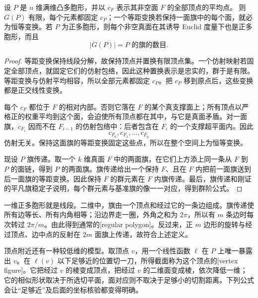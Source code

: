 \begin{lemma}
	\label{g1:lem:regular-polytope-centers}
	设 \(P\) 是 \(n\) 维满维凸多胞形，并以 \(c_F\) 表示其非空面 \(F\) 的全部顶点的平均点。
	则 \(G(P)\) 有限，每个元素都固定 \(c_P\)；一个等距变换若保持一面旗中的每个面，就必为恒等变换。若 \(P\) 为正多胞形，则每个非空真面在其诱导 Euclid 度量下也是正多胞形，而且
	\[
		|G(P)|=\text{\(P\) 的旗的数目}.
	\]
\end{lemma}
\begin{proof}
	等距变换保持线段分解，故保持顶点并置换有限顶点集。一个仿射映射若固定全部顶点，就固定它们的仿射包络，因此这种置换表示是忠实的，群于是有限。等距变换与仿射平均相容，所以全部元素都固定 \(c_P\)。把 \(c_P\) 移到原点后，这些变换都是正交线性变换。

	每个 \(c_F\) 都位于 \(F\) 的相对内部。否则它落在 \(F\) 的某个真支撑面上；所有顶点以严格正的权重平均到这个面，会迫使所有顶点都在其中，与它是真面矛盾。对一面旗，\(c_{F_i}\) 因而不在 \(F_{i-1}\) 的仿射包络中：后者包含在 \(F_i\) 的一个支撑超平面内。因此
	\[
		c_{F_0},c_{F_1},\ldots,c_{F_n}
	\]
	仿射无关。保持这面旗的等距变换固定这些点，所以在整个空间上为恒等变换。

	现设 \(P\) 旗传递。取一个 \(k\) 维真面 \(F\) 中的两面旗，在它们上方添上同一条从 \(F\) 到 \(P\) 的面链，得到 \(P\) 的两面旗。旗传递给出一个保持 \(F\)、且在 \(F\) 内把前一面旗送到后一面旗的等距变换。因此保持 \(F\) 的群元素在 \(F\) 内旗传递。最后，旗传递和刚证的平凡旗稳定子说明，每个群元素与基准旗的像一一对应，得到群阶公式。
\end{proof}

一维正多胞形就是线段。二维中，旗由一个顶点和经过它的一条边组成。旗传递使所有边等长、所有内角相等；沿边界走一圈，外角之和为 \(2\pi\)，所以有 \(m\) 条边时每次转过 \(2\pi/m\)。由此得到通常的[regular polygon]。反过来，正 \(m\) 边形的旋转与经过顶点、边中点的反射在 \(2m\) 面旗上传递，故符合上述定义。

\ProseParagraphBreak

顶点附近还有一种较低维的模型。取顶点 \(v\)，用一个线性函数 \(\ell\) 在 \(P\) 上唯一暴露出 \(v\)。在 \(\ell(v)\) 以下足够近的位置切一刀，所得截面称为这个顶点的[vertex figure]。它把经过 \(v\) 的棱变成顶点，把经过 \(v\) 的二维面变成棱，依次降低一维；它的相似形状取决于所选切平面，面对应则不取决于足够小的切割距离。下列公式会让“足够近”及后面的坐标核验都变得明确。

